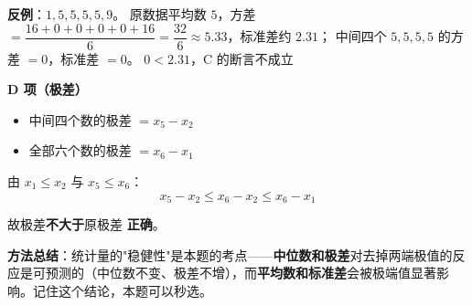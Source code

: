 \begin{answer}
\textbf{反例}：$1,5,5,5,5,9$。
原数据平均数 $5$，方差 $=\dfrac{16+0+0+0+0+16}6=\dfrac{32}6\approx5.33$，标准差约 $2.31$；
中间四个 $5,5,5,5$ 的方差 $=0$，标准差 $=0$。
$0<2.31$，C 的断言不成立 

\par\medskip

\textbf{D 项（极差）}

\begin{itemize}
\item 中间四个数的极差 $=x_5-x_2$
\item 全部六个数的极差 $=x_6-x_1$
\end{itemize}

由 $x_1\le x_2$ 与 $x_5\le x_6$：
\nopagebreak[4]
\[x_5-x_2\le x_6-x_2\le x_6-x_1\]

故极差\textbf{不大于}原极差  \textbf{正确}。

\begin{gktip}
\textbf{方法总结}：统计量的"稳健性"是本题的考点——\textbf{中位数和极差}对去掉两端极值的反应是可预测的（中位数不变、极差不增），而\textbf{平均数和标准差}会被极端值显著影响。记住这个结论，本题可以秒选。
\end{gktip}


\par\medskip

\end{answer}
